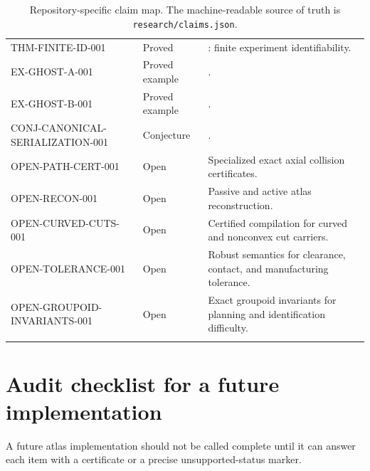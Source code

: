 \documentclass[11pt,openany]{book}
\theoremstyle{polyplain}
\theoremstyle{polydef}
\begin{document}
\begin{longtable}{L{0.25\textwidth}L{0.15\textwidth}L{0.50\textwidth}}
THM-FINITE-ID-001 & Proved & : finite experiment identifiability.\\
EX-GHOST-A-001 & Proved example & .\\
EX-GHOST-B-001 & Proved example & .\\
CONJ-CANONICAL-SERIALIZATION-001 & Conjecture & .\\
OPEN-PATH-CERT-001 & Open & Specialized exact axial collision certificates.\\
OPEN-RECON-001 & Open & Passive and active atlas reconstruction.\\
OPEN-CURVED-CUTS-001 & Open & Certified compilation for curved and nonconvex cut carriers.\\
OPEN-TOLERANCE-001 & Open & Robust semantics for clearance, contact, and manufacturing tolerance.\\
OPEN-GROUPOID-INVARIANTS-001 & Open & Exact groupoid invariants for planning and identification difficulty.\\
\bottomrule
\caption{Repository-specific claim map. The machine-readable source of truth is \texttt{research/claims.json}.}
\end{longtable}
\normalsize

\chapter{Audit checklist for a future implementation}

A future atlas implementation should not be called complete until it can answer each item with a certificate or a precise unsupported-status marker.
\end{document}
